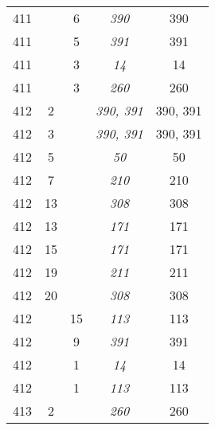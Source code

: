 \documentclass[a4paper,11pt]{article}
\begin{document}
\begin{center}
\begin{tabular}{|c|c|c|c|c|}
    411 & &  6 & \emph{390} & 390 \\
    411 & &  5 & \emph{391} & 391 \\
    411 & &  3 & \emph{14}  & 14 \\
    411 & &  3 & \emph{260} & 260 \\
    412 &  2 & & \emph{390, 391} & 390, 391 \\
    412 &  3 & & \emph{390, 391} & 390, 391 \\
    412 &  5 & & \emph{50}  & 50 \\
    412 &  7 & & \emph{210} & 210 \\
    412 & 13 & & \emph{308} & 308 \\
    412 & 13 & & \emph{171} & 171 \\
    412 & 15 & & \emph{171} & 171 \\
    412 & 19 & & \emph{211} & 211 \\
    412 & 20 & & \emph{308} & 308 \\
    412 & & 15 & \emph{113} & 113 \\
    412 & &  9 & \emph{391} & 391 \\
    412 & &  1 & \emph{14}  & 14 \\
    412 & &  1 & \emph{113} & 113 \\
    413 &  2 & & \emph{260} & 260 \\
    \hline
  \end{tabular}


\end{center}
\end{document}

